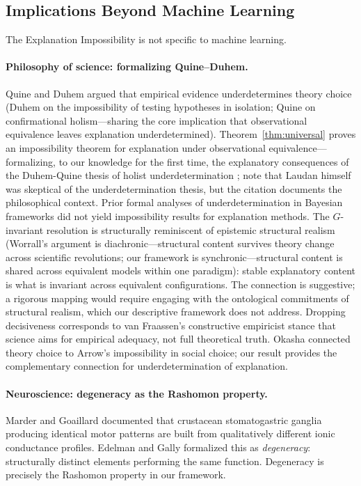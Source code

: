 \documentclass[11pt,a4paper]{article}
\begin{document}
\subsection{Implications Beyond Machine Learning}
\label{sec:beyond-ml}

The Explanation Impossibility is not specific to machine learning.

\paragraph{Philosophy of science: formalizing Quine--Duhem.}
Quine \citep{quine1951dogmas} and Duhem \citep{duhem1906aim} argued that
empirical evidence underdetermines theory choice
(Duhem on the impossibility of testing hypotheses in isolation; Quine on
confirmational holism---sharing the core implication that observational
equivalence leaves explanation underdetermined).  Theorem~\ref{thm:universal}
proves an impossibility theorem for explanation under observational
equivalence---formalizing, to our knowledge for the first time, the explanatory
consequences of the Duhem-Quine thesis of holist underdetermination
\citep{laudan1991empirical}; note that Laudan himself was skeptical of the
underdetermination thesis, but the citation documents the philosophical context.
Prior formal analyses of underdetermination in Bayesian
frameworks \citep{dorling1979bayesian,howson2006scientific} did not yield
impossibility results for explanation methods. The $G$-invariant
resolution is structurally reminiscent of epistemic structural
realism \citep{worrall1989structural}
(Worrall's argument is diachronic---structural content survives theory change
across scientific revolutions; our framework is synchronic---structural content
is shared across equivalent models within one paradigm): stable explanatory
content is what is invariant across equivalent configurations. The connection
is suggestive; a rigorous mapping would require engaging with the ontological
commitments of structural realism, which our descriptive framework does not
address.
Dropping decisiveness corresponds to van
Fraassen's \citep{vanfraassen1980scientific} constructive empiricist stance
that science aims for empirical adequacy, not full theoretical truth.
Okasha \citep{okasha2011theory} connected theory choice to Arrow's impossibility
in social choice; our result provides the complementary connection for
underdetermination of explanation.

\paragraph{Neuroscience: degeneracy as the Rashomon property.}
Marder and Goaillard \citep{marder2006variability} documented that crustacean
stomatogastric ganglia producing identical motor patterns are built from
qualitatively different ionic conductance profiles.  Edelman and Gally
\citep{edelman2001degeneracy} formalized this as \emph{degeneracy}:
structurally distinct elements performing the same function.  Degeneracy is
precisely the Rashomon property in our framework.
\end{document}
